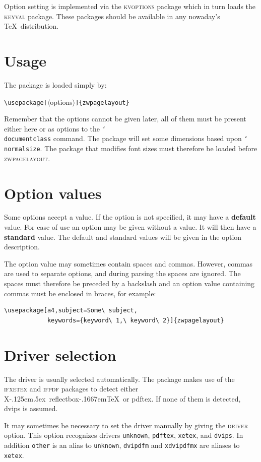 \documentclass[11pt]{article}
\def\omg#1{\ifvmode\leavevmode\fi\marginpar{\raggedright\hspace{0pt}\opt{#1}}\ignorespaces}
\def\opt#1{\texorpdfstring{\textmd{\textsc{#1}}}{#1}}
\let\pkg\textsc
\DeclareRobustCommand\cmd[1]{\texttt{\char`\\#1}}
\DeclareRobustCommand\XeTeX{X\kern-.125em\lower.5ex\hbox{\csname
              reflectbox\endcsname{E}}\kern-.1667em\TeX}
\begin{document}
Option setting is implemented via the \pkg{kvoptions} package which in turn loads the \pkg{keyval}
package. These packages should be available in any nowaday's \TeX\ distribution.

\section{Usage}
The package is loaded simply by:

\vb
\verb;\usepackage[;$\langle$options$\rangle$\verb;]{zwpagelayout};

\vb\noindent
Remember that the options cannot be given later, all of them must be present either here or as
options to the \cmd{documentclass} command. The package will set some dimensions based upon
\cmd{normalsize}. The package that modifies font sizes must therefore be loaded before
\pkg{zwpagelayout}.

\section{Option values}

Some options accept a value. If the option is not specified, it may have a \textbf{default} value. For ease of use an
option may be given without a value. It will then have a \textbf{standard} value. The default and standard
values will be given in the option description.

The option value may sometimes contain spaces and commas. However, commas are used to separate
options, and during parsing the spaces are ignored. The spaces must therefore be preceded by a
backslash and an option value containing commas must be enclosed in braces, for example:

\vb
\begin{verbatim}
\usepackage[a4,subject=Some\ subject,
            keywords={keyword\ 1,\ keyword\ 2}]{zwpagelayout}
\end{verbatim}

\section{Driver selection}\label{driver.selection}
The driver is usually selected automatically. The package makes use of the \pkg{ifxetex} and
\pkg{ifpdf} packages to detect either \XeTeX\ or pdftex. If none of them is detected, dvips is
assumed.

\omg{driver}
It may sometimes be necessary to set the driver manually by giving the \opt{driver} option. This
option recognizes drivers \texttt{unknown}, \texttt{pdftex}, \texttt{xetex}, and \texttt{dvips}. In
addition \texttt{other} is an alias to \texttt{unknown}, \texttt{dvipdfm} and \texttt{xdvipdfmx}
are aliases to \texttt{xetex}.
\end{document}
